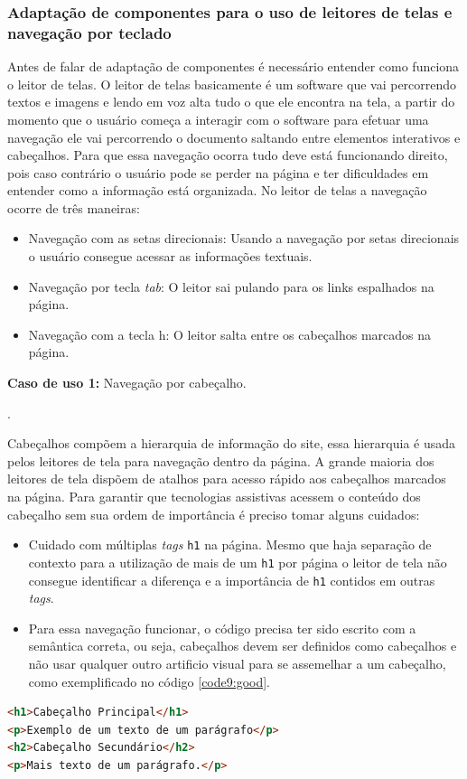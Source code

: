\subsubsection{Adaptação de componentes para o uso de leitores de telas e navegação por teclado}
{Antes de falar de adaptação de componentes é necessário entender como funciona o leitor de telas. O leitor de telas basicamente é um software que vai percorrendo textos e imagens e lendo em voz alta tudo o que ele encontra na tela, a partir do momento que o usuário começa a interagir com o software para efetuar uma navegação ele vai percorrendo o documento saltando entre elementos interativos e cabeçalhos. Para que essa navegação ocorra tudo deve está funcionando direito, pois caso contrário o usuário pode se perder na página e ter dificuldades em entender como a informação está organizada. No leitor de telas a navegação ocorre de três maneiras: 
\begin{itemize}
    \item Navegação com as setas direcionais: Usando a navegação por setas direcionais o usuário consegue acessar as informações textuais.
    \item Navegação por tecla \textit{tab}: O leitor sai pulando para os links espalhados na página.
    \item Navegação com a tecla h: O leitor salta entre os cabeçalhos marcados na página.
\end{itemize}

{
\vspace{1.5cm}
{\centerline{\textbf{Caso de uso 1:} Navegação por cabeçalho.}}.

Cabeçalhos compõem a hierarquia de informação do site, essa hierarquia é usada pelos leitores de tela para navegação dentro da página. A grande maioria dos leitores de tela dispõem de atalhos para acesso rápido aos cabeçalhos marcados na página. Para garantir que tecnologias assistivas acessem o conteúdo dos cabeçalho sem sua ordem de importância é preciso tomar alguns cuidados: 
\begin{itemize}
    \item Cuidado com múltiplas \textit{tags} \lstinline{h1} na página. Mesmo que haja separação de contexto para a utilização de mais de um \lstinline{h1} por página o leitor de tela não consegue identificar a diferença e a importância de \lstinline{h1} contidos em outras \textit{tags}.
    \item Para essa navegação funcionar, o código precisa ter sido escrito com a semântica correta, ou seja, cabeçalhos devem ser definidos como cabeçalhos e não usar qualquer outro artificio visual para se assemelhar a um cabeçalho, como exemplificado no código \ref{code9:good}. 
\end{itemize}
{\begin{lstlisting}[language=html,caption={cabeçalhos com hierarquia}, label=code9:good]
<h1>Cabeçalho Principal</h1>
<p>Exemplo de um texto de um parágrafo</p>
<h2>Cabeçalho Secundário</h2>
<p>Mais texto de um parágrafo.</p>
\end{lstlisting}}



}}
